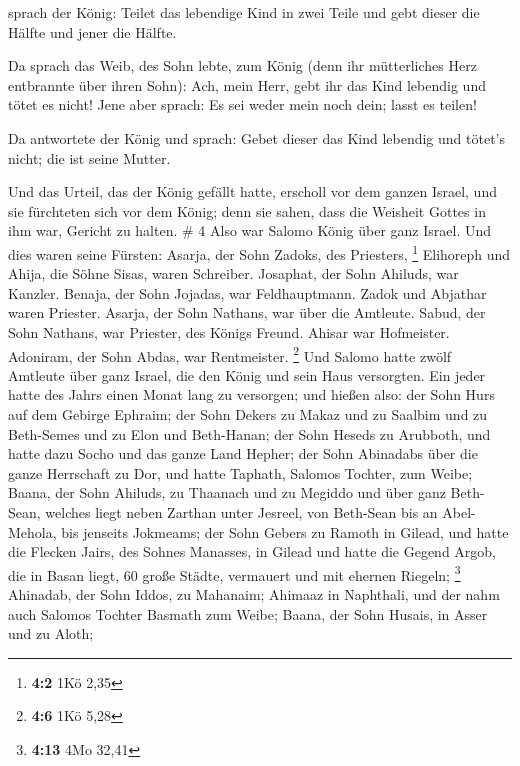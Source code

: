  sprach der König: Teilet das lebendige Kind in zwei
Teile und gebt dieser die Hälfte und jener die Hälfte.

 Da sprach das Weib, des Sohn lebte, zum König (denn ihr
mütterliches Herz entbrannte über ihren Sohn): Ach, mein Herr, gebt ihr
das Kind lebendig und tötet es nicht! Jene aber sprach: Es sei weder
mein noch dein; lasst es teilen!

 Da antwortete der König und sprach: Gebet dieser das
Kind lebendig und tötet's nicht; die ist seine Mutter.

 Und das Urteil, das der König gefällt hatte, erscholl
vor dem ganzen Israel, und sie fürchteten sich vor dem König; denn sie
sahen, dass die Weisheit Gottes in ihm war, Gericht zu halten. \# 4
 Also war Salomo König über ganz Israel. 
Und dies waren seine Fürsten: Asarja, der Sohn Zadoks, des Priesters,
\footnote{\textbf{4:2} 1Kö 2,35}  Elihoreph und Ahija, die
Söhne Sisas, waren Schreiber. Josaphat, der Sohn Ahiluds, war Kanzler.
 Benaja, der Sohn Jojadas, war Feldhauptmann. Zadok und
Abjathar waren Priester.  Asarja, der Sohn Nathans, war
über die Amtleute. Sabud, der Sohn Nathans, war Priester, des Königs
Freund.  Ahisar war Hofmeister. Adoniram, der Sohn Abdas,
war Rentmeister. \footnote{\textbf{4:6} 1Kö 5,28}  Und
Salomo hatte zwölf Amtleute über ganz Israel, die den König und sein
Haus versorgten. Ein jeder hatte des Jahrs einen Monat lang zu
versorgen;  und hießen also: der Sohn Hurs auf dem Gebirge
Ephraim;  der Sohn Dekers zu Makaz und zu Saalbim und zu
Beth-Semes und zu Elon und Beth-Hanan;  der Sohn Heseds
zu Arubboth, und hatte dazu Socho und das ganze Land Hepher;
 der Sohn Abinadabs über die ganze Herrschaft zu Dor, und
hatte Taphath, Salomos Tochter, zum Weibe;  Baana, der
Sohn Ahiluds, zu Thaanach und zu Megiddo und über ganz Beth-Sean,
welches liegt neben Zarthan unter Jesreel, von Beth-Sean bis an
Abel-Mehola, bis jenseits Jokmeams;  der Sohn Gebers zu
Ramoth in Gilead, und hatte die Flecken Jairs, des Sohnes Manasses, in
Gilead und hatte die Gegend Argob, die in Basan liegt, 60 große Städte,
vermauert und mit ehernen Riegeln; \footnote{\textbf{4:13} 4Mo 32,41}
 Ahinadab, der Sohn Iddos, zu Mahanaim; 
Ahimaaz in Naphthali, und der nahm auch Salomos Tochter Basmath zum
Weibe;  Baana, der Sohn Husais, in Asser und zu Aloth;
